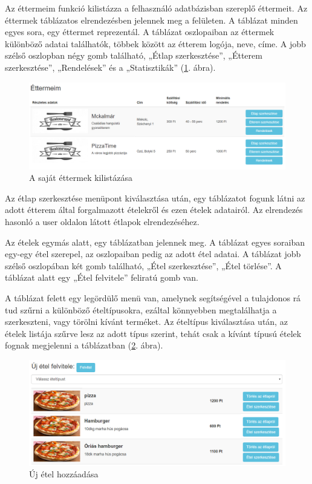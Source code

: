 

Az éttermeim funkció kilistázza a felhasználó adatbázisban szereplő éttermeit. Az éttermek táblázatos elrendezésben jelennek meg a felületen. A táblázat minden egyes sora, egy éttermet reprezentál. A táblázat oszlopaiban az éttermek különböző adatai találhatók, többek között az étterem logója, neve, címe. A jobb szélső oszlopban négy gomb található, „Étlap szerkesztése”, „Étterem szerkesztése”, „Rendelések” és a „Statisztikák” (\ref{fig:my_restaurants}. ábra).

\begin{figure}
\centering
\includegraphics[scale=0.5]{kepek/my_restaurants.png}
\caption{A saját éttermek kilistázása}
\label{fig:my_restaurants}
\end{figure}


Az étlap szerkesztése menüpont kiválasztása után, egy táblázatot fogunk látni az adott étterem által forgalmazott ételekről és ezen ételek adatairól. Az elrendezés hasonló a user oldalon látott étlapok elrendezéséhez.

Az ételek egymás alatt, egy táblázatban jelennek meg. A táblázat egyes soraiban egy-egy étel szerepel, az oszlopaiban pedig az adott étel adatai. A táblázat jobb szélső oszlopában két gomb található, „Étel szerkesztése”, „Étel törlése”. A táblázat alatt egy „Étel felvitele” feliratú gomb van.

A táblázat felett egy legördülő menü van, amelynek segítségével a tulajdonos rá tud szűrni a különböző ételtípusokra, ezáltal könnyebben megtalálhatja a szerkeszteni, vagy törölni kívánt terméket. Az ételtípus kiválasztása után, az ételek listája szűrve lesz az adott típus szerint, tehát csak a kívánt típusú ételek fognak megjelenni a táblázatban (\ref{fig:new_meal}. ábra).

\begin{figure}
\centering
\includegraphics[scale=0.6]{kepek/new_meal.png}
\caption{Új étel hozzáadása}
\label{fig:new_meal}
\end{figure}

